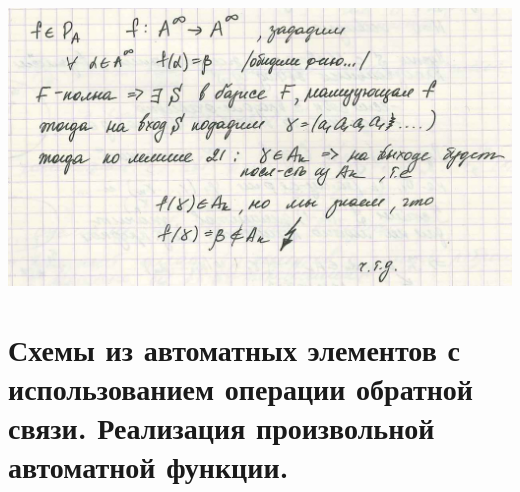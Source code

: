 \documentclass[12pt]{article}
\begin{document}
	\includegraphics[width=500pt]{43}

\section{Схемы из автоматных элементов с использованием операции обратной связи. Реализация произвольной автоматной функции.}
\end{document}
